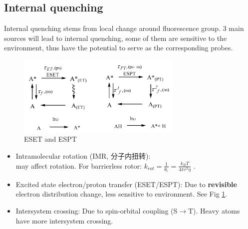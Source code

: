 \documentclass[12pt]{ctexart}
\begin{document}
\subsection*{Internal quenching}
Internal quenching stems from local change around fluorescence group. 3 main sources will lead to internal quenching, some of them are sensitive to the environment, thus have the potential to serve as the corresponding probes.
\begin{figure}[t]
    \centering
    \includegraphics[width=0.7\textwidth]{ESET_ESPT.png}
    \caption{ESET and ESPT}
    \label{ESET_ESPT}
\end{figure}
\begin{itemize}
    \item Intramolecular rotation (IMR, 分子内扭转):  \\  may affect rotation. For barrierless rotor: $k_{rot}=\frac{1}{\theta_r}=\frac{k_B T}{4\pi r^3\eta}$ .
    \item Excited state electron/proton transfer (ESET/ESPT): Due to \textbf{revisible} electron distribution change, less sensitive to environment. See Fig \ref{ESET_ESPT}.
    \item Intersystem crossing: Due to spin-orbital coupling (S$\to$T). Heavy atoms have more intersystem crossing.
    
\end{itemize}
\end{document}
